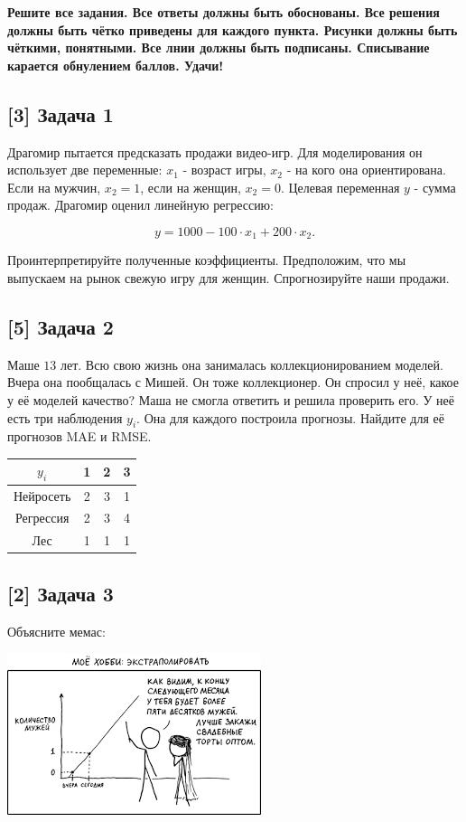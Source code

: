 \documentclass[12pt, a4paper, oneside]{article}
\begin{document}
\textbf{Решите все задания. Все ответы должны быть обоснованы. Все решения должны быть чётко приведены для каждого пункта. Рисунки должны быть чёткими, понятными. Все лнии должны быть подписаны. Списывание карается обнулением баллов. Удачи!}

\subsection*{[3] Задача 1 }

Драгомир пытается предсказать продажи видео-игр.  Для моделирования он использует две переменные: $x_1$ - возраст игры, $x_2$ - на кого она ориентирована. Если на мужчин, $x_2=1$, если на женщин, $x_2=0$. Целевая переменная $y$ - сумма продаж. Драгомир оценил линейную регрессию: 

$$ y = 1000 - 100 \cdot  x_1 + 200 \cdot  x_2.$$

Проинтерпретируйте полученные коэффициенты.  Предположим, что мы выпускаем на рынок свежую игру для женщин. Спрогнозируйте наши продажи. 


\subsection*{[5] Задача 2}

Маше $13$ лет. Всю свою жизнь она занималась коллекционированием моделей.  Вчера она пообщалась с Мишей. Он тоже коллекционер. Он спросил у неё, какое у её моделей качество? Маша не смогла ответить и решила проверить его. У неё есть три наблюдения $y_i$. Она для каждого построила прогнозы. Найдите для её прогнозов MAE и RMSE.

\begin{center}
	\begin{tabular}{c|c|c|c}
		$y_i$ &  1 & 2 & 3 \\
		\hline
		Нейросеть & 2 & 3 & 1  \\
		Регрессия &  2 & 3 & 4 \\
		Лес & 1 & 1 & 1 \\
	\end{tabular}
\end{center}


\subsection*{[2] Задача 3}

Объясните мемас: 

\begin{center}
	\includegraphics[scale=0.7]{memes.png}
\end{center}
\end{document}
